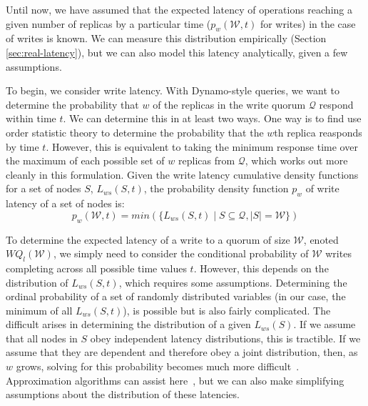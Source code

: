 \documentclass{vldb}
\begin{document}
\label{sec:dynamo-prop}

Until now, we have assumed that the expected latency of operations
reaching a given number of replicas by a particular time
($p_w(\mathcal{W}, t)$ for writes) in the case of writes is known.  We
can measure this distribution empirically (Section
\ref{sec:real-latency}), but we can also model this latency
analytically, given a few assumptions.

To begin, we consider write latency.  With Dynamo-style queries, we
want to determine the probability that $w$ of the replicas in the
write quorum $\mathcal{Q}$ respond within time $t$.  We can determine
this in at least two ways.  One way is to find use order statistic
theory to determine the probability that the $w$th replica reasponds
by time $t$.  However, this is equivalent to taking the minimum
response time over the maximum of each possible set of $w$ replicas
from $\mathcal{Q}$, which works out more cleanly in this formulation.
Given the write latency cumulative density functions for a set of
nodes $S$, $L_{ws}(S, t)$, the probability density function $p_w$ of
write latency of a set of nodes is:
\begin{equation}
p_w(\mathcal{W}, t) = min(\{L_{ws}(S, t) \mid S \subseteq \mathcal{Q}, |S| = \mathcal{W}\})
\end{equation}

To determine the expected latency of a write to a quorum of size
$\mathcal{W}$, enoted $WQ_l(\mathcal{W})$, we simply need to consider
the conditional probability of $\mathcal{W}$ writes completing across
all possible time values $t$.  However, this depends on the
distribution of $L_{ws}(S, t)$, which requires some
assumptions. Determining the ordinal probability of a set of randomly
distributed variables (in our case, the minimum of all $L_{ws}(S,
t)$), is possible but is also fairly complicated.  The difficult
arises in determining the distribution of a given $L_{ws}(S)$.  If we
assume that all nodes in $S$ obey independent latency distributions,
this is tractible.  If we assume that they are dependent and therefore
obey a joint distribution, then, as $w$ grows, solving for this
probability becomes much more difficult~\cite{needed}.  Approximation
algorithms can assist here~\cite{needed}, but we can also make
simplifying assumptions about the distribution of these latencies.
\end{document}
